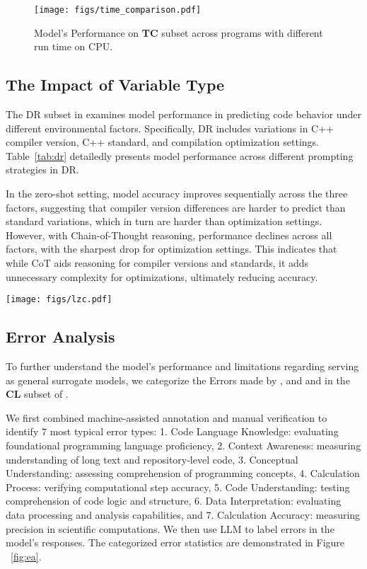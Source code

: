 \begin{figure}[!h]
    \centering
    \texttt{[image: figs/time\_comparison.pdf]}
    \caption{Model's Performance on \textbf{TC} subset across programs with different run time on CPU.}
    \label{fig:time}
\end{figure}

\subsection{The Impact of Variable Type}

The DR subset in \bench examines model performance in predicting code behavior under different environmental factors. Specifically, DR includes variations in C++ compiler version, C++ standard, and compilation optimization settings. Table~\ref{tab:dr} detailedly presents model performance across different prompting strategies in DR.

In the zero-shot setting, model accuracy improves sequentially across the three factors, suggesting that compiler version differences are harder to predict than standard variations, which in turn are harder than optimization settings. However, with Chain-of-Thought reasoning, performance declines across all factors, with the sharpest drop for optimization settings. This indicates that while CoT aids reasoning for compiler versions and standards, it adds unnecessary complexity for optimizations, ultimately reducing accuracy.

\begin{figure*}[!h]
    \centering
    \texttt{[image: figs/lzc.pdf]}
    \caption{Breakdown of error types across different language models and prompting methods.}
    \label{fig:ea}
\end{figure*}

\subsection{Error Analysis}

To further understand the model's performance and limitations regarding serving as general surrogate models, we categorize the Errors made by ,  and  and in the \textbf{CL} subset of \bench.

We first combined machine-assisted annotation and manual verification to identify $7$ most typical error types: 1. Code Language Knowledge: evaluating foundational programming language proficiency, 2. Context Awareness: measuring understanding of long text and repository-level code, 3. Conceptual Understanding: assessing comprehension of programming concepts, 4. Calculation Process: verifying computational step accuracy, 5. Code Understanding: testing comprehension of code logic and structure, 6. Data Interpretation: evaluating data processing and analysis capabilities, and 7. Calculation Accuracy: measuring precision in scientific computations. We then use LLM to label errors in the model's responses. The categorized error statistics are demonstrated in Figure ~\ref{fig:ea}.

